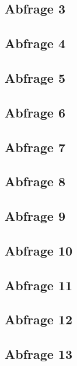 \subsection{Abfrage 3}

\subsection{Abfrage 4}

\subsection{Abfrage 5}

\subsection{Abfrage 6}

\subsection{Abfrage 7}

\subsection{Abfrage 8}

\subsection{Abfrage 9}

\subsection{Abfrage 10}

\subsection{Abfrage 11}

\subsection{Abfrage 12}

\subsection{Abfrage 13}

